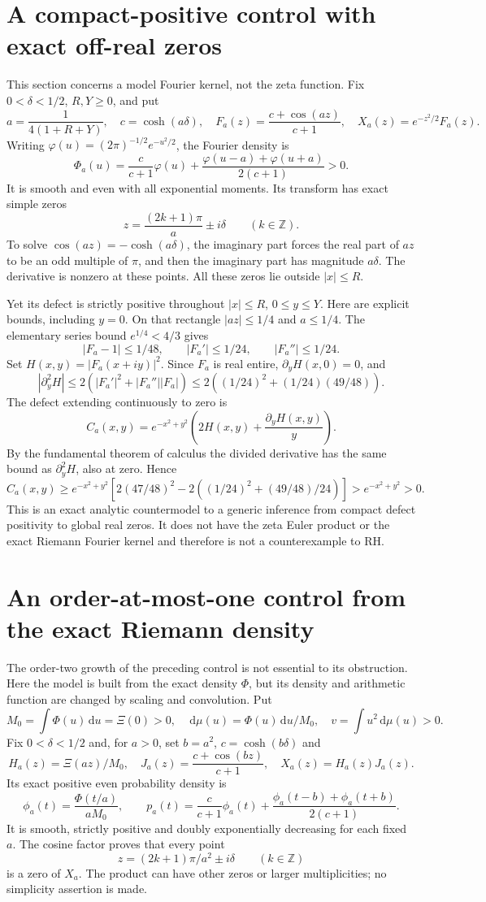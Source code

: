 \documentclass[11pt]{article}
\theoremstyle{remark}\newtheorem{remark}[theorem]{Remark}
\newcommand{\Z}{\mathbb Z}
\newcommand{\dd}{\,\mathrm d}
\begin{document}
\section{A compact-positive control with exact off-real zeros}
This section concerns a model Fourier kernel, not the zeta function.
Fix $0<\delta<1/2$, $R,Y\ge0$, and put
\[
 a=\frac1{4(1+R+Y)},\quad c=\cosh(a\delta),\quad
 F_a(z)=\frac{c+\cos(az)}{c+1},\quad X_a(z)=e^{-z^2/2}F_a(z).
\]
Writing $\varphi(u)=(2\pi)^{-1/2}e^{-u^2/2}$, the Fourier density is
\[
 \Phi_a(u)=\frac{c}{c+1}\varphi(u)+
 \frac{\varphi(u-a)+\varphi(u+a)}{2(c+1)}>0.
\]
It is smooth and even with all exponential moments. Its transform has
exact simple zeros
\[
 z=\frac{(2k+1)\pi}{a}\pm i\delta\qquad(k\in\Z).
\]
To solve $\cos(az)=-\cosh(a\delta)$, the imaginary part forces the real
part of $az$ to be an odd multiple of $\pi$, and then the imaginary part
has magnitude $a\delta$. The derivative is nonzero at these points.
All these zeros lie outside $|x|\le R$.

Yet its defect is strictly positive throughout $|x|\le R$, $0\le y\le Y$.
Here are explicit bounds, including $y=0$. On that rectangle
$|az|\le1/4$ and $a\le1/4$. The elementary series bound
$e^{1/4}<4/3$ gives
\[
 |F_a-1|\le1/48,\qquad |F_a'|\le1/24,\qquad |F_a''|\le1/24.
\]
Set $H(x,y)=|F_a(x+iy)|^2$. Since $F_a$ is real entire,
$\partial_yH(x,0)=0$, and
\[
 |\partial_y^2H|\le2(|F_a'|^2+|F_a''||F_a|)
 \le2\left((1/24)^2+(1/24)(49/48)\right).
\]
The defect extending continuously to zero is
\[
 C_a(x,y)=e^{-x^2+y^2}
 \left(2H(x,y)+\frac{\partial_yH(x,y)}{y}\right).
\]
By the fundamental theorem of calculus the divided derivative has the
same bound as $\partial_y^2H$, also at zero. Hence
\[
 C_a(x,y)\ge e^{-x^2+y^2}
 \left[2(47/48)^2-2((1/24)^2+(49/48)/24)\right]
 >e^{-x^2+y^2}>0.
\]
This is an exact analytic countermodel to a generic inference from
compact defect positivity to global real zeros. It does not have the
zeta Euler product or the exact Riemann Fourier kernel and therefore
is not a counterexample to RH.

\section{An order-at-most-one control from the exact Riemann density}
The order-two growth of the preceding control is not essential to its
obstruction. Here the model is built from the exact density $\Phi$, but
its density and arithmetic function are changed by scaling and convolution.
Put
\[
 M_0=\int\Phi(u)\dd u=\Xi(0)>0,\quad
 \dd\mu(u)=\Phi(u)\dd u/M_0,\quad
 v=\int u^2\dd\mu(u)>0.
\]
Fix $0<\delta<1/2$ and, for $a>0$, set $b=a^2$, $c=\cosh(b\delta)$ and
\[
 H_a(z)=\Xi(az)/M_0,\quad
 J_a(z)=\frac{c+\cos(bz)}{c+1},\quad X_a(z)=H_a(z)J_a(z).
\]
Its exact positive even probability density is
\[
 \phi_a(t)=\frac{\Phi(t/a)}{aM_0},\qquad
 p_a(t)=\frac{c}{c+1}\phi_a(t)
       +\frac{\phi_a(t-b)+\phi_a(t+b)}{2(c+1)}.
\]
It is smooth, strictly positive and doubly exponentially decreasing for
each fixed $a$. The cosine factor proves that every point
\[
 z=(2k+1)\pi/a^2\pm i\delta\qquad(k\in\Z)
\]
is a zero of $X_a$. The product can have other zeros or larger
multiplicities; no simplicity assertion is made.
\end{document}

